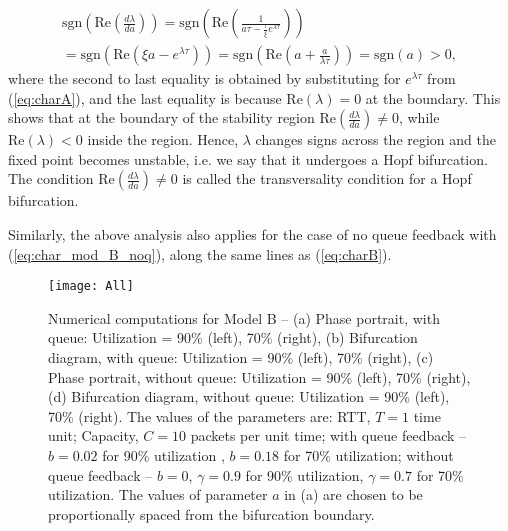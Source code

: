 \documentclass[conference]{IEEEtran}
\begin{document}
\begin{multline}
\label{eq:signs}
\text{sgn}\left(\text{Re}\left(\frac{d\lambda}{da}\right)\right) = \text{sgn}\left(\text{Re}\left(\frac{1}{a\tau - \frac{\tau}{\xi} e^{\lambda\tau}}\right)\right) \\
 = \text{sgn}\left(\text{Re}\left(\xi a - e^{\lambda\tau}\right)\right)
 = \text{sgn}\left(\text{Re}\left(a + \frac{a}{\lambda\tau}\right)\right)
 = \text{sgn}\left(a\right) > 0,
\end{multline}
where the second to last equality is obtained by substituting for $e^{\lambda\tau}$ from 
(\ref{eq:charA}), and the last equality is because $\text{Re}\left(\lambda\right) = 0$ at the boundary. This shows that at the boundary of the 
stability region $\text{Re}\left(\frac{d\lambda}{da}\right) \neq 0$, while $\text{Re}\left(\lambda\right) < 0$ inside the region. Hence, $\lambda$ changes signs across the region and the fixed point becomes unstable, i.e. we say that it undergoes a Hopf bifurcation.
The condition $\text{Re}\left(\frac{d\lambda}{da}\right) \neq 0$ is
called the transversality condition for a Hopf bifurcation.

Similarly, the above analysis also applies for the case of no queue feedback with (\ref{eq:char_mod_B_noq}), along the same lines as (\ref{eq:charB}).

\begin{figure*}
\centering
{}





\texttt{[image: All]}
\caption{Numerical computations for Model B -- (a) Phase portrait, with queue: Utilization = 90\% (left), 
70\% (right), (b) Bifurcation diagram, with queue: Utilization = 90\% (left), 70\% (right), 
(c) Phase portrait, without queue: Utilization = 90\% (left), 70\% (right), (d) Bifurcation diagram, 
without queue: Utilization = 90\% (left), 70\% (right). The values of the parameters are: RTT, $T = 1$ time unit; 
Capacity, $C = 10$ packets per unit time; with queue feedback -- $b = 0.02$ for 90\% utilization , $b = 0.18$ for 
70\% utilization; without queue feedback -- $b=0$, $\gamma = 0.9$ for 90\% utilization, $\gamma = 0.7$ for
 70\% utilization. The values of parameter $a$ in (a) are chosen to be proportionally spaced from the bifurcation boundary.}
\label{4x2_plot}
\end{figure*}
\end{document}
